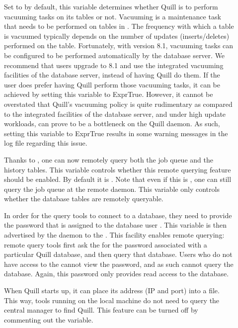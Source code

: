 \begin{description}
\item[]
Set to  by default, this variable determines whether Quill is to 
perform vacuuming tasks on its tables or not. Vacuuming is a maintenance 
task that needs to be performed on tables in . The 
frequency with which a table is vacuumed typically depends on the number 
of updates (inserts/deletes) performed on the table. Fortunately, with 
 version 8.1, vacuuming tasks can be configured to be 
performed automatically by the database server. We recommend that users 
upgrade to 8.1 and use the integrated vacuuming facilities of the database 
server, instead of having Quill do them. If the user does prefer having 
Quill perform those vacuuming tasks, it can be achieved by setting this 
variable to Expr{True}. However, it cannot be overstated that Quill's vacuuming 
policy is quite rudimentary as compared to the integrated facilities 
of the database server, and under high update workloads, can prove to 
be a bottleneck on the Quill daemon. As such, setting this variable to 
Expr{True} results in some warning messages in the log file regarding this 
issue.

\item[]
Thanks to 
,
one can now remotely query both the job queue and the
history tables. This variable controls whether this remote querying 
feature should be enabled.  By default it is .  Note that even if 
this is , one can still query the job queue 
at the remote  daemon.
This variable only controls whether the database tables are remotely queryable.

\item[]
In order for the query tools to connect to a database, they need to provide
the password that is assigned to the database user . 
This variable is then advertised by the  daemon
to the .  
This facility enables remote querying: remote  query tools first 
ask the  for
the password associated with a particular Quill database, 
and then query that database.  Users who do not have access to the 
cannot view the password, and as such cannot query the database.  Again, this 
password only provides read access to the database.

\item[]
When Quill starts up, it can place its address (IP and port)
into a file.  This way, tools running on the local machine do not
need to query the central manager to find Quill.  This 
feature can be turned off by commenting out the variable.

\end{description}


